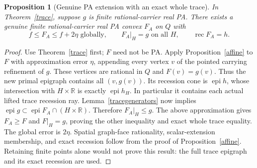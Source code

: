 \documentclass[11pt]{article}
\newtheorem{proposition}[theorem]{Proposition}
\theoremstyle{definition}\newtheorem{definition}[theorem]{Definition}
\theoremstyle{remark}\newtheorem{remark}[theorem]{Remark}
\newcommand{\R}{\mathbb R}\newcommand{\Q}{\mathbb Q}
\newcommand{\epi}{\operatorname{epi}}\newcommand{\conv}{\operatorname{conv}}
\newcommand{\rec}{\operatorname{rec}}\newcommand{\dom}{\operatorname{dom}}
\begin{document}
\begin{proposition}[Genuine PA extension with an exact whole trace]\label{sync}
In Theorem~\ref{trace}, suppose $g$ is finite rational-carrier real PA. There exists a genuine finite rational-carrier real PA convex $F_A$ on $Q$ with
\[
f\leq F_A\leq f+2\eta\text{ globally},\qquad F_A|_H=g\text{ on all }H,\qquad\rec F_A=h.
\]
\end{proposition}
\begin{proof}
Use Theorem~\ref{trace} first; $F$ need not be PA. Apply Proposition~\ref{affine} to $F$ with approximation error $\eta$, appending every vertex $v$ of the pointed carrying refinement of $g$. These vertices are rational in $Q$ and $F(v)=g(v)$. Thus the new primal epigraph contains all $(v,g(v))$. Its recession cone is $\epi h$, whose intersection with $H\times\R$ is exactly $\epi h_H$. In particular it contains each actual lifted trace recession ray. Lemma~\ref{tracegenerators} now implies
$\epi g\subset \epi F_A\cap(H\times\R)$.
Therefore $F_A|_H\leq g$. The above approximation gives $F_A\geq F$ and $F|_H=g$, proving the other inequality and exact whole trace equality. The global error is $2\eta$. Spatial graph-face rationality, scalar-extension membership, and exact recession follow from the proof of Proposition~\ref{affine}. Retaining finite points alone would not prove this result: the full trace epigraph and its exact recession are used.
\end{proof}
\end{document}
